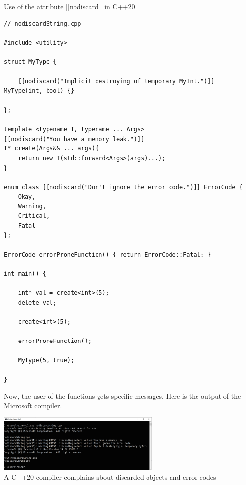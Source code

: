\noindent
Use of the attribute [[nodiscard]] in C++20
\begin{lstlisting}[style=styleCXX]
// nodiscardString.cpp

#include <utility>

struct MyType {

	[[nodiscard("Implicit destroying of temporary MyInt.")]] MyType(int, bool) {}
	
};

template <typename T, typename ... Args>
[[nodiscard("You have a memory leak.")]]
T* create(Args&& ... args){
	return new T(std::forward<Args>(args)...);
}

enum class [[nodiscard("Don't ignore the error code.")]] ErrorCode {
	Okay,
	Warning,
	Critical,
	Fatal
};
 
ErrorCode errorProneFunction() { return ErrorCode::Fatal; }

int main() {

	int* val = create<int>(5);
	delete val;
	
	create<int>(5);
	
	errorProneFunction();
	
	MyType(5, true);

}
\end{lstlisting}

Now, the user of the functions gets specific messages. Here is the output of the Microsoft compiler.

\begin{center}
\includegraphics[width=0.6\textwidth]{content/3/chapter4/images/46.png}\\
A C++20 compiler complains about discarded objects and error codes
\end{center}

